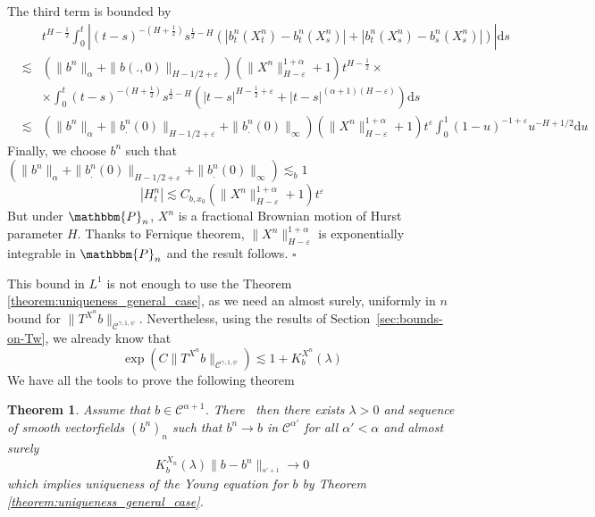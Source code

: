 \documentclass[a4paper,11pt]{article}
\newcommand{\mathd}{\mathrm{d}}
\newtheorem{theorem}{Theorem}[section]
\newenvironment{proof}{{\sc Proof.}}{\hfill$\square$}
\newcommand{\CC}{\mathscr C}
\begin{document}
\begin{proof}
  
  The third term is bounded by
  \begin{eqnarray*}
    &  & t^{H- \frac{1}{2}}  \int_{0}^{t} \left\lvert (t-s)^{-(H+ \frac{1}{2} )}
    s^{\frac{1}{2} -H}  ( | b^{n}_{t} (X_{t}^{n} )-b^{n}_{t} ( X_{s}^{n} ) | +
    | b^{n}_{t} ( X_{s}^{n} ) -b^{n}_{s} (X_{s}^{n} ) | ) \right\lvert \mathd s\\
    & \lesssim & ( \| b^{n} \|_{\alpha} + \| b ( .,0 ) \|_{H-1/2+
    \varepsilon} ) ( \|X^{n} \|^{1+ \alpha}_{H- \varepsilon} +1 ) t^{H-
    \frac{1}{2}}  \times \\ & & \times \int_{0}^{t} (t-s)^{- (H+ \frac{1}{2} )} s^{\frac{1}{2} -H} 
    \left( |t-s|^{H- \frac{1}{2} + \varepsilon} +|t-s|^{( \alpha +1)(H-
    \varepsilon )} \right) \mathd s\\
    & \lesssim & ( \| b^{n} \|_{\alpha} + \| b^{n}_{.} ( 0 ) \|_{H-1/2+
    \varepsilon} + \| b^{n}_{.} ( 0 ) \|_{\infty} ) ( \|X^{n} \|^{1+
    \alpha}_{H- \varepsilon} +1 ) t^{\varepsilon} \int_{0}^{1} ( 1-u )^{-1+
    \varepsilon} u^{-H+1/2} \mathd u
  \end{eqnarray*}
  Finally, we choose $b^{n}$ such that $( \| b^{n} \|_{\alpha} + \| b^{n}_{.}
  ( 0 ) \|_{H-1/2+ \varepsilon} + \| b^{n}_{.} ( 0 ) \|_{\infty} )
  \lesssim_{b} 1$
  \[ | H_{t}^{n} | \lesssim C_{b,x_{0}} ( \|X^{n} \|^{1+ \alpha}_{H-
     \varepsilon} +1 ) t^{\varepsilon} \]
  But under $\mathbbm{P}_{n}$, $X^{n}$ is a fractional Brownian motion of
  Hurst parameter $H$. Thanks to Fernique theorem, $\|X^{n} \|^{1+ \alpha}_{H-
  \varepsilon}$ is exponentially integrable in $\mathbbm{P}_{n}$ and the
  result follows.
\end{proof}


This bound in $L^{1}$ is not enough to use the Theorem
\ref{theorem:uniqueness_general_case}, as we need an almost surely, uniformly
in $n$ bound for $\| T^{X^{n}} b \|_{\CC^{\gamma ,1, \psi}}$. Nevertheless,
using the results of Section~\ref{sec:bounds-on-Tw}, we
already know that
\[ \exp \left( C \| T^{X^{n}} b \|_{\CC^{\gamma ,1, \psi}} \right) \lesssim
   1+K^{X^{n}}_{b} ( \lambda ) \]
We have all the tools to prove the following theorem

\begin{theorem}
  Assume that $b \in \CC^{\alpha +1}$. There \ then there exists $\lambda >0$
  and sequence of smooth vectorfields $(b^{n} )_{n}$ such that $b^{n} \to b$
  in $\CC^{\alpha'}$ for all $\alpha' < \alpha$ and almost surely
  \[ K_{b}^{X_{n}} ( \lambda )  \|b-b^{n} \|_{^{\alpha' +1}} \to 0 \]
  which implies uniqueness of the Young equation for $b$ by Theorem
  \ref{theorem:uniqueness_general_case}.
\end{theorem}
\end{document}
